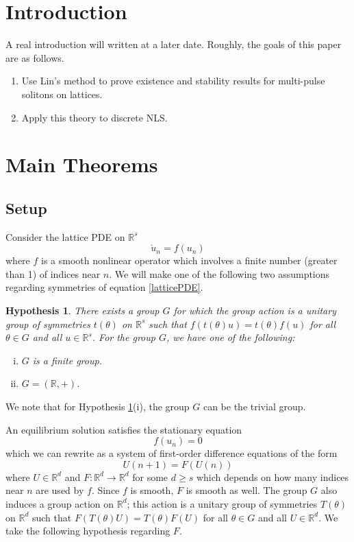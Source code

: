 \documentclass[12pt]{article}
\def\R{{\mathbb R}}
\newtheorem{hypothesis}{Hypothesis}
\begin{document}
\section{Introduction}

A real introduction will written at a later date. Roughly, the goals of this paper are as follows.
\begin{enumerate}
	\item Use Lin's method to prove existence and stability results for multi-pulse solitons on lattices. 
	\item Apply this theory to discrete NLS.
\end{enumerate}

\section{Main Theorems}

\subsection{Setup}

Consider the lattice PDE on $\R^s$
\begin{equation}\label{latticePDE}
\dot{u}_n = f(u_n)
\end{equation}
where $f$ is a smooth nonlinear operator which involves a finite number (greater than 1) of indices near $n$. We will make one of the following two assumptions regarding symmetries of equation \eqref{latticePDE}.

\begin{hypothesis}\label{symmetryhyp}
There exists a group $G$ for which the group action is a unitary group of symmetries $t(\theta)$ on $\R^s$ such that $f(t(\theta)u) = t(\theta)f(u)$ for all $\theta \in G$ and all $u \in \R^s$. For the group $G$, we have one of the following:
\begin{enumerate}[(i)]
\item $G$ is a finite group.
\item $G = (\R, +)$.
\end{enumerate}
\end{hypothesis}
We note that for Hypothesis \ref{symmetryhyp}(i), the group $G$ can be the trivial group.

An equilibrium solution satisfies the stationary equation 
\begin{equation}\label{stationaryeq}
f(u_n) = 0
\end{equation}
which we can rewrite as a system of first-order difference equations of the form
\begin{equation}\label{diffeq}
U(n+1) = F(U(n))
\end{equation}
where $U \in \R^d$ and $F:\R^d \rightarrow \R^d$ for some $d \geq s$ which depends on how many indices near $n$ are used by $f$. Since $f$ is smooth, $F$ is smooth as well. The group $G$ also induces a group action on $\R^d$; this action is a unitary group of symmetries $T(\theta)$ on $\R^d$ such that $F(T(\theta)U) = T(\theta)F(U)$ for all $\theta \in G$ and all $U \in \R^d$. We take the following hypothesis regarding $F$.
\end{document}
